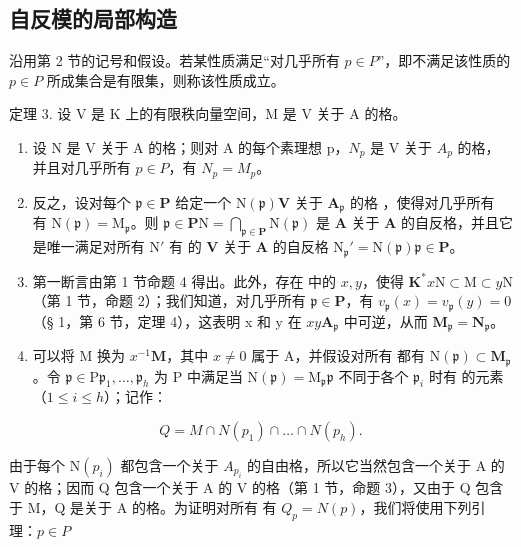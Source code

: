 \subsection{自反模的局部构造}

沿用第 2 节的记号和假设。若某性质满足``对几乎所有 \(p \in P\)''，即不满足该性质的 \(p \in P\) 所成集合是有限集，则称该性质成立。

定理 3. 设 V 是 K 上的有限秩向量空间，M 是 V 关于 A 的格。

\begin{enumerate}
\def\labelenumi{(\roman{enumi})}
\item
  设 N 是 V 关于 A 的格；则对 A 的每个素理想 p，\(N_{p}\) 是 V 关于 \(A_{p}\) 的格，并且对几乎所有 \(p \in P\)，有 \(N_{p} = M_{p}\)。
\item
  反之，设对每个 \(\mathfrak{p} \in \mathbf{P}\) 给定一个 \(\mathrm{N}(\mathfrak{p})\)\(\mathbf{V}\) 关于 \(\mathbf{A}_{\mathfrak{p}}\) 的格 ，使得对几乎所有  有 \(\mathrm{N}(\mathfrak{p}) = \mathrm{M}_{\mathfrak{p}}\)。则 \(\mathfrak{p} \in \mathbf{P}\)\(\mathrm{N} = \bigcap_{\mathfrak{p} \in \mathbf{P}} \mathrm{N}(\mathfrak{p})\) 是 \(\mathbf{A}\) 关于 \(\mathbf{A}\) 的自反格，并且它是唯一满足对所有 \(\mathrm{N}'\) 有  的 \(\mathbf{V}\) 关于 \(\mathbf{A}\) 的自反格 \(\mathrm{N}_{\mathfrak{p}}' = \mathrm{N}(\mathfrak{p})\)\(\mathfrak{p} \in \mathbf{P}\)。
\item
  第一断言由第 1 节命题 4 得出。此外，存在  中的 \(x, y\)，使得 \(\mathbf{K}^*\)\(x\mathrm{N} \subset \mathrm{M} \subset y\mathrm{N}\)（第 1 节，命题 2）；我们知道，对几乎所有 \(\mathfrak{p} \in \mathbf{P}\)，有 \(v_{\mathfrak{p}}(x) = v_{\mathfrak{p}}(y) = 0\)（§ 1，第 6 节，定理 4），这表明 x 和 y 在 \(x\)\(y\)\(\mathbf{A}_{\mathfrak{p}}\) 中可逆，从而 \(\mathbf{M}_{\mathfrak{p}} = \mathbf{N}_{\mathfrak{p}}\)。
\item
  可以将 M 换为 \(x^{-1}\mathbf{M}\)，其中 \(x \neq 0\) 属于 A，并假设对所有  都有 \(\mathrm{N}(\mathfrak{p}) \subset \mathbf{M}_{\mathfrak{p}}\)。令 \(\mathfrak{p} \in \mathrm{P}\)\(\mathfrak{p}_1, \ldots, \mathfrak{p}_h\) 为 P 中满足当 \(\mathrm{N}(\mathfrak{p}) = \mathrm{M}_{\mathfrak{p}}\)\(\mathfrak{p}\) 不同于各个 \(\mathfrak{p}_i\) 时有  的元素（\(1 \leqslant i \leqslant h\)）；记作：
\end{enumerate}

\[
Q = M \cap N (p _ {1}) \cap \dots \cap N (p _ {h}).
\]

由于每个 \(\mathrm{N}(p_{i})\) 都包含一个关于 \(A_{p_{i}}\) 的自由格，所以它当然包含一个关于 A 的 V 的格；因而 Q 包含一个关于 A 的 V 的格（第 1 节，命题 3），又由于 Q 包含于 M，Q 是关于 A 的格。为证明对所有  有 \(Q_{p} = N(p)\)，我们将使用下列引理：\(p \in P\)

